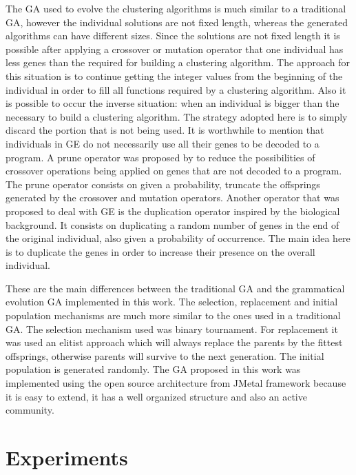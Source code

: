 \documentclass[journal]{IEEEtran}
\begin{document}
The GA used to evolve the clustering algorithms is much similar to a traditional GA, however the individual solutions are not fixed length, whereas the generated algorithms can have different sizes. Since the solutions are not fixed length it is possible after applying a crossover or mutation operator that one individual has less genes than the required for building a clustering algorithm. The approach for this situation is to continue getting the integer values from the beginning of the individual in order to fill all functions required by a clustering algorithm. Also it is possible to occur the inverse situation: when an individual is bigger than the necessary to build a clustering algorithm. The strategy adopted here is to simply discard the portion that is not being used. It is worthwhile to mention that individuals in GE do not necessarily use all their genes to be decoded to a program. A prune operator was proposed by \cite{ryan1998grammatical} to reduce the possibilities of crossover operations being applied on genes that are not decoded to a program. The prune operator consists on given a probability, truncate the offsprings generated by the crossover and mutation operators. Another operator that was proposed to deal with GE is the duplication operator inspired by the biological background. It consists on duplicating a random number of genes in the end of the original individual, also given a probability of occurrence. The main idea here is to duplicate the genes in order to increase their presence on the overall individual.

These are the main differences between the traditional GA and the grammatical evolution GA  implemented in this work. The selection, replacement and initial population mechanisms are much more similar to the ones used in a traditional GA. The selection mechanism used was binary tournament. For replacement it was used an elitist approach which will always replace the parents by the fittest offsprings, otherwise parents will survive to the next generation. The initial population is generated randomly. 
The GA proposed in this work was implemented using the open source architecture from JMetal framework \cite{jMetal} because it is easy to extend, it has a well organized structure and also an active community.  

\section{Experiments} \label{sec:experiments}
\end{document}
